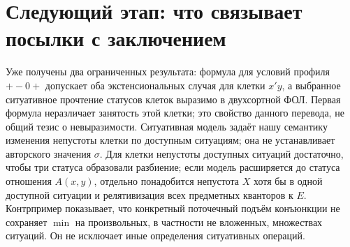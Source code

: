 \documentclass[12pt,a4paper]{article}
\begin{document}
\section{Следующий этап: что связывает посылки с заключением}

Уже получены два ограниченных результата: формула для условий профиля \(+-0+\) допускает оба экстенсиональных случая для клетки \(x'y\), а выбранное ситуативное прочтение статусов клеток выразимо в двухсортной ФОЛ. Первая формула неразличает занятость этой клетки; это свойство данного перевода, не общий тезис о невыразимости. Ситуативная модель задаёт нашу семантику изменения непустоты клетки по доступным ситуациям; она не устанавливает авторского значения \(\sigma\). Для клетки непустоты доступных ситуаций достаточно, чтобы три статуса образовали разбиение; если модель расширяется до статуса отношения \(A(x,y)\), отдельно понадобится непустота \(X\) хотя бы в одной доступной ситуации и релятивизация всех предметных кванторов к \(E\). Контрпример показывает, что конкретный поточечный подъём конъюнкции не сохраняет \(\min\) на произвольных, в частности не вложенных, множествах ситуаций. Он не исключает иные определения ситуативных операций.
\end{document}
